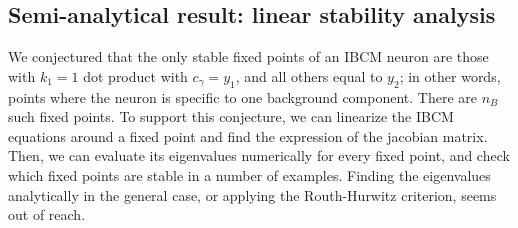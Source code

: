 \subsection{Semi-analytical result: linear stability analysis}
\label{subsec:linear_stability}
We conjectured that the only stable fixed points of an IBCM neuron are those with $k_1 = 1$ dot product with $c_{\gamma} = y_1$, and all others equal to $y_2$; in other words, points where the neuron is specific to one background component. There are $n_B$ such fixed points. 
To support this conjecture, we can linearize the IBCM equations around a fixed point and find the expression of the jacobian matrix. Then, we can evaluate its eigenvalues numerically for every fixed point, and check which fixed points are stable in a number of examples. Finding the eigenvalues analytically in the general case, or applying the Routh-Hurwitz criterion, seems out of reach. 

